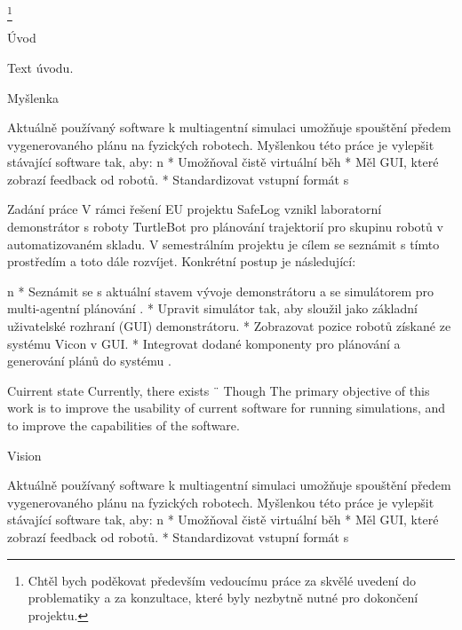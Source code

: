 \thanks {Chtěl bych poděkovat především vedoucímu práce \kulich za skvělé uvedení do problematiky a za konzultace, které byly nezbytně nutné pro dokončení projektu.}
\makefront



\chap Úvod


Text úvodu.

\sec Myšlenka

Aktuálně používaný software k multiagentní simulaci umožňuje spouštění předem vygenerovaného plánu na fyzických robotech. Myšlenkou této práce je vylepšit stávající software tak, aby:
\begitems \style n
    * Umožňoval čistě virtuální běh
    * Měl GUI, které zobrazí feedback od robotů.
    * Standardizovat vstupní formát s \mapfIR
\enditems

\sec Zadání práce
V rámci řešení EU projektu SafeLog vznikl laboratorní demonstrátor s roboty TurtleBot pro plánování trajektorií pro skupinu robotů v automatizovaném skladu. V semestrálním projektu je cílem se seznámit s tímto prostředím a toto dále rozvíjet. Konkrétní postup je následující:


\begitems \style n
    * Seznámit se s aktuální stavem vývoje demonstrátoru a se simulátorem pro multi-agentní plánování \mapfIR.
    * Upravit simulátor tak, aby sloužil jako základní uživatelské rozhraní (GUI) demonstrátoru.
    * Zobrazovat pozice robotů získané ze systému Vicon v GUI.
    * Integrovat dodané komponenty pro plánování a generování plánů do systému .
\enditems

\sec Cuirrent state
Currently, there exists ¨\oldRepo
\sec Though
The primary objective of this work is to improve the usability of current software for running simulations, and to improve the capabilities of the software.

\sec Vision

Aktuálně používaný software k multiagentní simulaci umožňuje spouštění předem vygenerovaného plánu na fyzických robotech. Myšlenkou této práce je vylepšit stávající software tak, aby:
\begitems \style n
    * Umožňoval čistě virtuální běh
    * Měl GUI, které zobrazí feedback od robotů.
    * Standardizovat vstupní formát s \mapfIR
\enditems




\bye
\endtt
